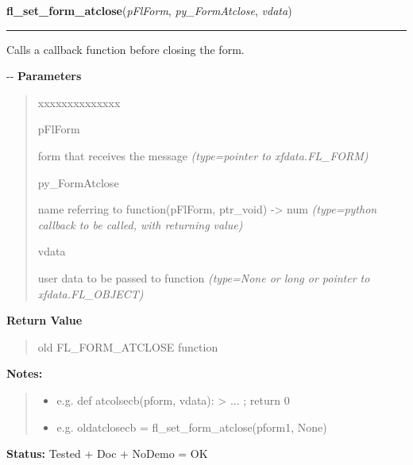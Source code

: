\hspace{.8\funcindent}\begin{boxedminipage}{\funcwidth}

    \raggedright \textbf{fl\_set\_form\_atclose}(\textit{pFlForm}, \textit{py\_FormAtclose}, \textit{vdata})

    \vspace{-1.5ex}

    \rule{\textwidth}{0.5\fboxrule}
\setlength{\parskip}{2ex}

Calls a callback function before closing the form.

-{}-
\setlength{\parskip}{1ex}
      \textbf{Parameters}
      \vspace{-1ex}

      \begin{quote}
        \begin{Ventry}{xxxxxxxxxxxxxx}

          \item[pFlForm]


form that receives the message
            {\it (type=pointer to xfdata.FL\_FORM)}

          \item[py\_FormAtclose]


name referring to function(pFlForm, ptr\_void) -> num
            {\it (type=python callback to be called, with returning value)}

          \item[vdata]


user data to be passed to function
            {\it (type=None or long or pointer to xfdata.FL\_OBJECT)}

        \end{Ventry}

      \end{quote}

      \textbf{Return Value}
    \vspace{-1ex}

      \begin{quote}

old FL\_FORM\_ATCLOSE function
      \end{quote}

\textbf{Notes:}
\begin{quote}
  \begin{itemize}

  \item
    \setlength{\parskip}{0.6ex}

e.g. def atcolsecb(pform, vdata): > ... ; return 0


  \item 
e.g. oldatclosecb = fl\_set\_form\_atclose(pform1, None)


\end{itemize}

\end{quote}

\textbf{Status:} 
Tested + Doc + NoDemo = OK


    \end{boxedminipage}

